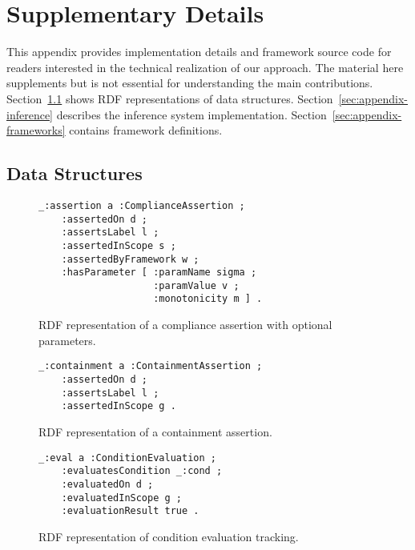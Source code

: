 \documentclass{IOS-Book-Article}
\begin{document}



\newpage
\appendix
\section{Supplementary Details}

This appendix provides implementation details and framework source code for readers interested in the technical realization of our approach. The material here supplements but is not essential for understanding the main contributions. Section~\ref{sec:appendix-rdf} shows RDF representations of data structures. Section~\ref{sec:appendix-inference} describes the inference system implementation. Section~\ref{sec:appendix-frameworks} contains framework definitions.

\subsection{Data Structures}\label{sec:appendix-rdf}

\begin{figure}[ht]
\begin{lstlisting}[basicstyle=\ttfamily, frame=none]
_:assertion a :ComplianceAssertion ;
    :assertedOn d ;
    :assertsLabel l ;
    :assertedInScope s ;
    :assertedByFramework w ;
    :hasParameter [ :paramName sigma ;
                    :paramValue v ;
                    :monotonicity m ] .
\end{lstlisting}
\caption{RDF representation of a compliance assertion with optional parameters.}
\label{fig:appendix-compliance-assertion}
\end{figure}

\begin{figure}[ht]
\begin{lstlisting}[basicstyle=\ttfamily, frame=none]
_:containment a :ContainmentAssertion ;
    :assertedOn d ;
    :assertsLabel l ;
    :assertedInScope g .
\end{lstlisting}
\caption{RDF representation of a containment assertion.}
\label{fig:appendix-containment-assertion}
\end{figure}

\begin{figure}[ht]
\begin{lstlisting}[basicstyle=\ttfamily, frame=none]
_:eval a :ConditionEvaluation ;
    :evaluatesCondition _:cond ;
    :evaluatedOn d ;
    :evaluatedInScope g ;
    :evaluationResult true .
\end{lstlisting}
\caption{RDF representation of condition evaluation tracking.}
\label{fig:appendix-condition-eval}
\end{figure}
\end{document}
